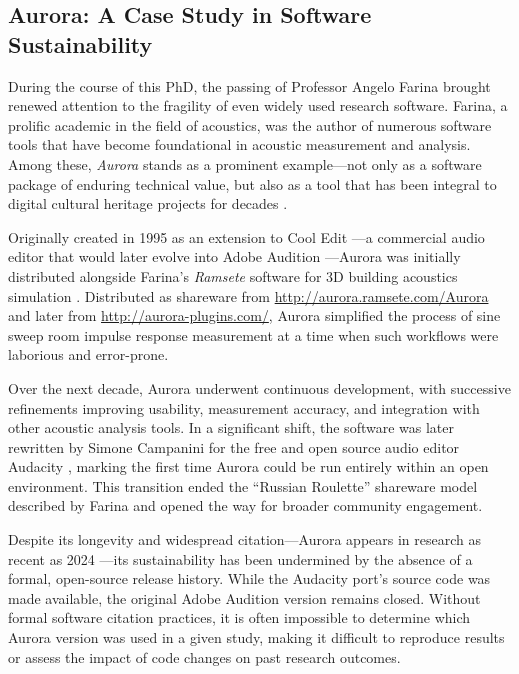 \subsection{Aurora: A Case Study in Software Sustainability}

During the course of this PhD, the passing of Professor Angelo Farina brought renewed attention to the fragility of even widely used research software. Farina, a prolific academic in the field of acoustics, was the author of numerous software tools that have become foundational in acoustic measurement and analysis. Among these, \emph{Aurora} stands as a prominent example—not only as a software package of enduring technical value, but also as a tool that has been integral to digital cultural heritage projects for decades \cite{fausti_acoustic_2000,frey_acoustical_2013,almagropastor_assessing_2021}.

Originally created in 1995 \cite{farina_auralization_1995} as an extension to Cool Edit \cite{tronchin_acoustics_1997}—a commercial audio editor that would later evolve into Adobe Audition \cite{farina_listening_2004}—Aurora was initially distributed alongside Farina’s \emph{Ramsete} software for 3D building acoustics simulation \cite{farina_aurora_1995}. Distributed as shareware from \url{http://aurora.ramsete.com/Aurora} and later from \url{http://aurora-plugins.com/}, Aurora simplified the process of sine sweep room impulse response measurement \cite{farina_aurora_2000} at a time when such workflows were laborious and error-prone.

Over the next decade, Aurora underwent continuous development, with successive refinements improving usability, measurement accuracy, and integration with other acoustic analysis tools. In a significant shift, the software was later rewritten by Simone Campanini for the free and open source audio editor Audacity \cite{farina_new_2009}, marking the first time Aurora could be run entirely within an open environment. This transition ended the “Russian Roulette” shareware model described by Farina \cite{farina_registration_2007} and opened the way for broader community engagement.

Despite its longevity and widespread citation—Aurora appears in research as recent as 2024 \cite{fontana_highly_2024,popp_speech_2024,denti_pan_2024}—its sustainability has been undermined by the absence of a formal, open-source release history. While the Audacity port’s source code was made available, the original Adobe Audition version remains closed. Without formal software citation practices, it is often impossible to determine which Aurora version was used in a given study, making it difficult to reproduce results or assess the impact of code changes on past research outcomes.

